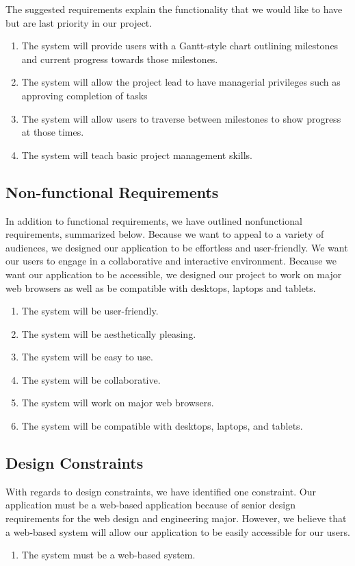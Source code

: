 \begin{enumerate}
The suggested requirements explain the functionality that we would like to have but are last priority in our project. 
	\begin{enumerate}
	\item The system will provide users with a Gantt-style chart outlining milestones and current progress towards those milestones.
	\item The system will allow the project lead to have managerial privileges such as approving completion of tasks
	\item The system will allow users to traverse between milestones to show progress at those times.
	\item The system will teach basic project management skills.
	\end{enumerate}
\end{enumerate}
\subsection{Non-functional Requirements}
In addition to functional requirements, we have outlined nonfunctional requirements, summarized below. Because we want to appeal to a variety of audiences, we designed our application to be effortless and user-friendly. We want our users to engage in a collaborative and interactive environment. Because we want our application to be accessible, we designed our project to work on major web browsers as well as be compatible with desktops, laptops and tablets.
\begin{enumerate}
\item The system will be user-friendly.
\item The system will be aesthetically pleasing.
\item The system will be easy to use.
\item The system will be collaborative.
\item The system will work on major web browsers. 
\item The system will be compatible with desktops, laptops, and tablets. 
\end{enumerate}
\subsection{Design Constraints}
With regards to design constraints, we have identified one constraint. Our application must be a web-based application because of senior design requirements for the web design and engineering major. However, we believe that a web-based system will allow our application to be easily accessible for our users. 
\begin{enumerate}
\item The system must be a web-based system.
\end{enumerate}
